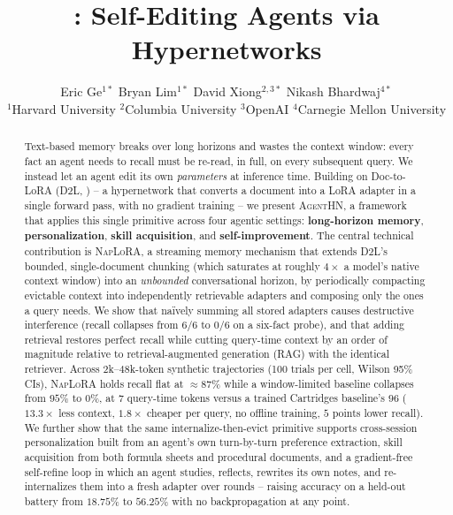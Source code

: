 \documentclass[11pt]{article}
\title{\agenthn: Self-Editing Agents via Hypernetworks}
\author{
  Eric Ge$^{1*}$ \quad Bryan Lim$^{1*}$ \quad David Xiong$^{2,3*}$ \quad Nikash Bhardwaj$^{4*}$ \\[4pt]
  $^{1}$Harvard University \quad
  $^{2}$Columbia University \quad
  $^{3}$OpenAI \quad
  $^{4}$Carnegie Mellon University \\
}
\newcommand{\DTL}{D2L}
\newcommand{\agenthn}{\textsc{AgentHN}}
\newcommand{\naplora}{\textsc{NapLoRA}}
\begin{document}
\maketitle

\def\thefootnote{}\def\thefootnote{\arabic{footnote}}

\begin{abstract}
Text-based memory breaks over long horizons and wastes the context window: every fact an agent needs to recall must be re-read, in full, on every subsequent query. We instead let an agent edit its own \emph{parameters} at inference time. Building on Doc-to-LoRA (\DTL{}, \citealp{charakorn2026doctolora}) -- a hypernetwork that converts a document into a LoRA adapter in a single forward pass, with no gradient training -- we present \agenthn{}, a framework that applies this single primitive across four agentic settings: \textbf{long-horizon memory}, \textbf{personalization}, \textbf{skill acquisition}, and \textbf{self-improvement}. The central technical contribution is \naplora{}, a streaming memory mechanism that extends \DTL{}'s bounded, single-document chunking (which saturates at roughly $4\times$ a model's native context window) into an \emph{unbounded} conversational horizon, by periodically compacting evictable context into independently retrievable adapters and composing only the ones a query needs. We show that na\"ively summing all stored adapters causes destructive interference (recall collapses from $6/6$ to $0/6$ on a six-fact probe), and that adding retrieval restores perfect recall while cutting query-time context by an order of magnitude relative to retrieval-augmented generation (RAG) with the identical retriever. Across $2$k--$48$k-token synthetic trajectories (100 trials per cell, Wilson 95\% CIs), \naplora{} holds recall flat at $\approx\!87\%$ while a window-limited baseline collapses from $95\%$ to $0\%$, at $7$ query-time tokens versus a trained Cartridges \citep{eyuboglu2025cartridges} baseline's $96$ ($13.3\times$ less context, $1.8\times$ cheaper per query, no offline training, $5$ points lower recall). We further show that the same internalize-then-evict primitive supports cross-session personalization built from an agent's own turn-by-turn preference extraction, skill acquisition from both formula sheets and procedural documents, and a gradient-free self-refine loop in which an agent studies, reflects, rewrites its own notes, and re-internalizes them into a fresh adapter over rounds -- raising accuracy on a held-out battery from $18.75\%$ to $56.25\%$ with no backpropagation at any point.
\end{abstract}
\end{document}
